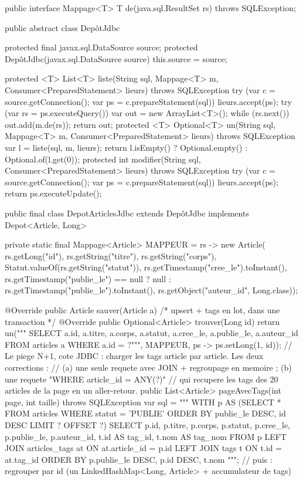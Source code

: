 \begin{codejava}
public interface Mappage<T> { T de(java.sql.ResultSet rs) throws SQLException; }

public abstract class Dep\^otJdbc {
    protected final javax.sql.DataSource source;
    protected Dep\^otJdbc(javax.sql.DataSource source) { this.source = source; }

    protected <T> List<T> liste(String sql, Mappage<T> m, Consumer<PreparedStatement> lieurs) throws SQLException {
        try (var c = source.getConnection(); var ps = c.prepareStatement(sql)) {
            lieurs.accept(ps);
            try (var rs = ps.executeQuery()) {
                var out = new ArrayList<T>();
                while (rs.next()) { out.add(m.de(rs)); }
                return out;
            }
        }
    }
    protected <T> Optional<T> un(String sql, Mappage<T> m, Consumer<PreparedStatement> lieurs) throws SQLException {
        var l = liste(sql, m, lieurs);
        return l.isEmpty() ? Optional.empty() : Optional.of(l.get(0));
    }
    protected int modifier(String sql, Consumer<PreparedStatement> lieurs) throws SQLException {
        try (var c = source.getConnection(); var ps = c.prepareStatement(sql)) {
            lieurs.accept(ps);
            return ps.executeUpdate();
        }
    }
}

public final class DepotArticlesJdbc extends Dep\^otJdbc implements Depot<Article, Long> {
    private static final Mappage<Article> MAPPEUR = rs -> new Article(
            rs.getLong("id"), rs.getString("titre"), rs.getString("corps"),
            Statut.valueOf(rs.getString("statut")),
            rs.getTimestamp("cree_le").toInstant(),
            rs.getTimestamp("publie_le") == null ? null : rs.getTimestamp("publie_le").toInstant(),
            rs.getObject("auteur_id", Long.class));

    @Override public Article sauver(Article a) { /* upsert + tags en lot, dans une transaction */ }
    @Override public Optional<Article> trouver(Long id) {
        return un("""
                SELECT a.id, a.titre, a.corps, a.statut, a.cree_le, a.publie_le, a.auteur_id
                FROM articles a WHERE a.id = ?""", MAPPEUR, ps -> ps.setLong(1, id));
    }
    // Le piege N+1, cote JDBC : charger les tags article par article. Les deux corrections :
    //  (a) une seule requete avec JOIN + regroupage en memoire ; (b) une requete "WHERE article_id = ANY(?)"
    //      qui recupere les tags des 20 articles de la page en un aller-retour.
    public List<Article> pageAvecTags(int page, int taille) throws SQLException {
        var sql = """
            WITH p AS (SELECT * FROM articles WHERE statut = 'PUBLIE'
                       ORDER BY publie_le DESC, id DESC LIMIT ? OFFSET ?)
            SELECT p.id, p.titre, p.corps, p.statut, p.cree_le, p.publie_le, p.auteur_id,
                   t.id AS tag_id, t.nom AS tag_nom
            FROM p LEFT JOIN articles_tags at ON at.article_id = p.id
                   LEFT JOIN tags t ON t.id = at.tag_id
            ORDER BY p.publie_le DESC, p.id DESC, t.nom
            """;
        // puis : regrouper par id (un LinkedHashMap<Long, Article> + accumulateur de tags)
    }
}
\end{codejava}


